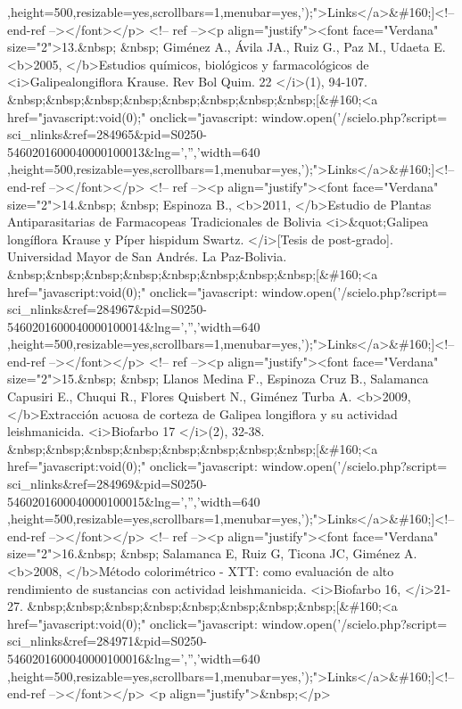 ,height=500,resizable=yes,scrollbars=1,menubar=yes,');">Links</a>\&\#160;]<!--
end-ref --></font></p> <!-- ref --><p align="justify"><font face="Verdana"
size="2">13.\&nbsp; \&nbsp; Giménez A., Ávila JA., Ruiz G., Paz M., Udaeta E.
<b>2005, </b>Estudios químicos, biológicos y farmacológicos de
<i>Galipealongiflora Krause. Rev Bol Quim. 22 </i>(1), 94-107.
\&nbsp;\&nbsp;\&nbsp;\&nbsp;\&nbsp;\&nbsp;\&nbsp;\&nbsp;[\&\#160;<a
href="javascript:void(0);" onclick="javascript: window.open('/scielo.php?script=
sci\_{}nlinks\&ref=284965\&pid=S0250-5460201600040000100013\&lng=','','width=640
,height=500,resizable=yes,scrollbars=1,menubar=yes,');">Links</a>\&\#160;]<!--
end-ref --></font></p> <!-- ref --><p align="justify"><font face="Verdana"
size="2">14.\&nbsp; \&nbsp; Espinoza B., <b>2011, </b>Estudio de Plantas
Antiparasitarias de Farmacopeas Tradicionales de Bolivia <i>\&quot;Galipea
longíflora Krause y Píper hispidum Swartz. </i>[Tesis de post-grado].
Universidad Mayor de San Andrés. La Paz-Bolivia.
\&nbsp;\&nbsp;\&nbsp;\&nbsp;\&nbsp;\&nbsp;\&nbsp;\&nbsp;[\&\#160;<a
href="javascript:void(0);" onclick="javascript: window.open('/scielo.php?script=
sci\_{}nlinks\&ref=284967\&pid=S0250-5460201600040000100014\&lng=','','width=640
,height=500,resizable=yes,scrollbars=1,menubar=yes,');">Links</a>\&\#160;]<!--
end-ref --></font></p> <!-- ref --><p align="justify"><font face="Verdana"
size="2">15.\&nbsp; \&nbsp; Llanos Medina F., Espinoza Cruz B., Salamanca
Capusiri E., Chuqui R., Flores Quisbert N., Giménez Turba A. <b>2009,
</b>Extracción acuosa de corteza de Galipea longiflora y su actividad
leishmanicida. <i>Biofarbo 17 </i>(2), 32-38.
\&nbsp;\&nbsp;\&nbsp;\&nbsp;\&nbsp;\&nbsp;\&nbsp;\&nbsp;[\&\#160;<a
href="javascript:void(0);" onclick="javascript: window.open('/scielo.php?script=
sci\_{}nlinks\&ref=284969\&pid=S0250-5460201600040000100015\&lng=','','width=640
,height=500,resizable=yes,scrollbars=1,menubar=yes,');">Links</a>\&\#160;]<!--
end-ref --></font></p> <!-- ref --><p align="justify"><font face="Verdana"
size="2">16.\&nbsp; \&nbsp; Salamanca E, Ruiz G, Ticona JC, Giménez A. <b>2008,
</b>Método colorimétrico - XTT: como evaluación de alto rendimiento de
sustancias con actividad leishmanicida. <i>Biofarbo 16, </i>21-27.
\&nbsp;\&nbsp;\&nbsp;\&nbsp;\&nbsp;\&nbsp;\&nbsp;\&nbsp;[\&\#160;<a
href="javascript:void(0);" onclick="javascript: window.open('/scielo.php?script=
sci\_{}nlinks\&ref=284971\&pid=S0250-5460201600040000100016\&lng=','','width=640
,height=500,resizable=yes,scrollbars=1,menubar=yes,');">Links</a>\&\#160;]<!--
end-ref --></font></p> <p align="justify">\&nbsp;</p>
